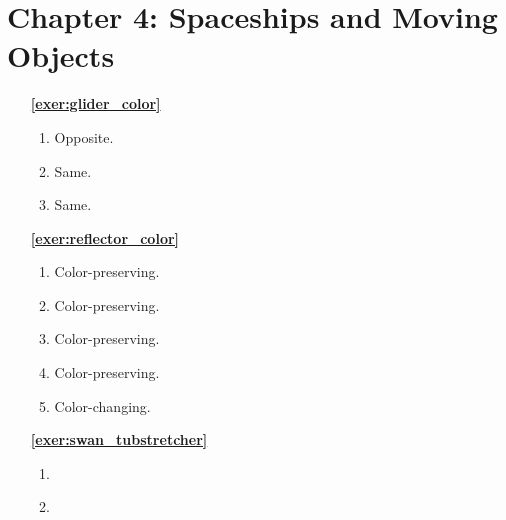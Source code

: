 \hypertarget{solutions_spaceships}{}\label{solutions_spaceships}
\section*{Chapter 4: Spaceships and Moving Objects}
\renewcommand{\chapterfolder}{spaceships/}

\begin{multicols}{2}
	\begin{itemize}[leftmargin=0em]
		\item[\bf\color{ocre}\sffamily\ref{exer:glider_color}]
		\begin{enumerate}[leftmargin=1.5em,label=\bf\color{ocre}(\alph*)]
			\item Opposite.
			
			\item Same.
			
			\item Same. \\
		\end{enumerate}
		
		
		\item[\bf\color{ocre}\sffamily\ref{exer:reflector_color}]
		\begin{enumerate}[leftmargin=1.5em,label=\bf\color{ocre}(\alph*),series=solu_reflector_color]
			\item Color-preserving.
			
			\item Color-preserving.
			
			\item Color-preserving.
			
			\item Color-preserving.
			
			\item Color-changing. \\
		\end{enumerate}
		
		
		\item[\bf\color{ocre}\sffamily\ref{exer:swan_tubstretcher}]
		\begin{enumerate}[leftmargin=1.5em,label=\bf\color{ocre}(\alph*)]
			\item {}
			
			\item {} \\
		\end{enumerate}
		


\end{itemize}
\end{multicols}
